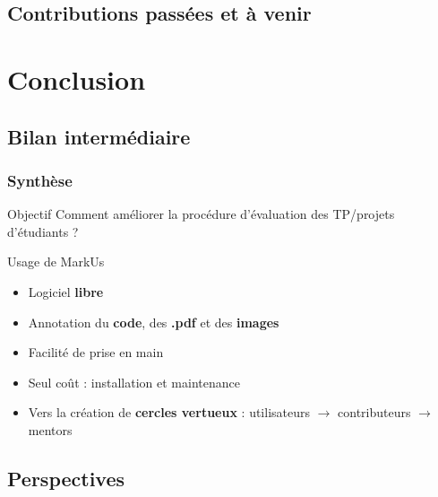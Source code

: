 \documentclass[hyperref,french,usenames,xcolor=dvipsnames]{beamer}
\begin{document}


\subsection*{Contributions passées et à venir}

\section{Conclusion}

\subsection*{Bilan intermédiaire}

\frame
{
  \frametitle{Synthèse}

\begin{alertblock}{Objectif}
Comment améliorer la procédure d'évaluation des TP/projets d'étudiants ?
\end{alertblock}

\begin{block}{Usage de MarkUs}

\begin{itemize}
\item Logiciel \textbf{libre} 
\item Annotation du \textbf{code}, des \textbf{.pdf} et des \textbf{images} 
\item Facilité de prise en main
\item Seul coût : installation et maintenance 
\item Vers la création de \textbf{cercles vertueux} : utilisateurs $\rightarrow$ contributeurs $\rightarrow$ mentors
\end{itemize}
\end{block}
}

\subsection*{Perspectives}
\end{document}

